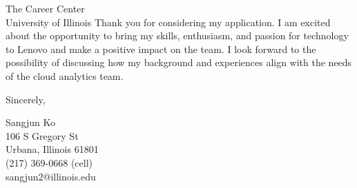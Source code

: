 \documentclass{letter}
\begin{document}
\begin{letter}{The Career Center\\
University of Illinois}
Thank you for considering my application. I am excited about the opportunity
to bring my skills, enthusiasm, and passion for technology to Lenovo and make a
positive impact on the team. I look forward to the possibility of discussing
how my background and experiences align with the needs of the cloud analytics team.



\closing{Sincerely,
}

Sangjun Ko\\
106 S Gregory St\\
Urbana, Illinois 61801\\
(217) 369-0668 (cell)\\sangjun2@illinois.edu
\end{letter}
\end{document}
